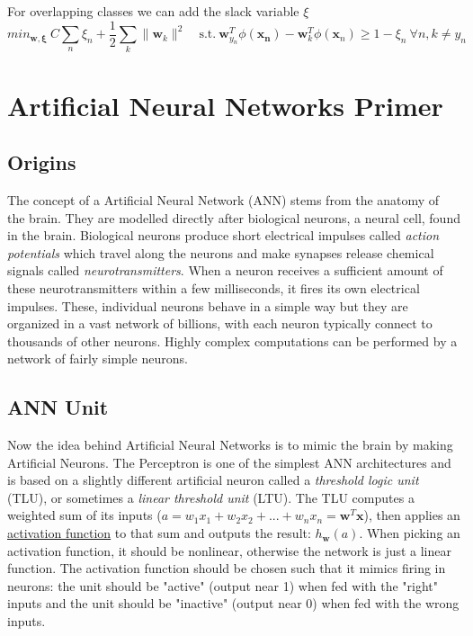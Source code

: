 \documentclass[12pt]{article}
\begin{document}
            For overlapping classes we can add the slack variable $\xi$
            $$ min_{\boldsymbol{w}, \boldsymbol{\xi}} \ C \sum_n \xi_n + \frac{1}{2} \sum_k \|\boldsymbol{w}_k \|^2 \quad \textrm{s.t.} \
            \boldsymbol{w}^T_{y_n} \phi(\boldsymbol{x_n}) - \boldsymbol{w}^T_k \phi(\boldsymbol{x}_n) \geq 1 - \xi_n \ 
            \forall n,k \neq y_n $$

\section{Artificial Neural Networks Primer}
    \subsection{Origins}
        The concept of a Artificial Neural Network (ANN) stems from the anatomy of the brain. They are modelled directly
        after biological neurons, a neural cell, found in the brain. Biological neurons produce short electrical
        impulses called \textit{action potentials} which travel along the neurons and make synapses release chemical
        signals called \textit{neurotransmitters}. When a neuron receives a sufficient amount of these neurotransmitters
        within a few milliseconds, it fires its own electrical impulses. These, individual neurons behave in a simple
        way but they are organized in a vast network of billions, with each neuron typically connect to thousands of
        other neurons. Highly complex computations can be performed by a network of fairly simple neurons.

    \subsection{ANN Unit}
        Now the idea behind Artificial Neural Networks is to mimic the brain by making Artificial Neurons. The
        Perceptron is one of the simplest ANN architectures and is based on a slightly different artificial neuron
        called a \textit{threshold logic unit} (TLU), or sometimes a \textit{linear threshold unit} (LTU). The TLU
        computes a weighted sum of its inputs ($a = w_1x_1 + w_2x_2 + ... + w_nx_n = \boldsymbol{w}^T\boldsymbol{x}$),
        then applies an \hyperref[sec:ActivationFunction]{activation function} to that sum and outputs the result:
        $h_{\boldsymbol{w}}(a)$. When picking an activation function, it should be nonlinear, otherwise the network is
        just a linear function. The activation function should be chosen such that it mimics firing in neurons: the unit
        should be "active" (output near 1) when fed with the "right" inputs and the unit should be "inactive" (output
        near 0) when fed with the wrong inputs.
\end{document}
